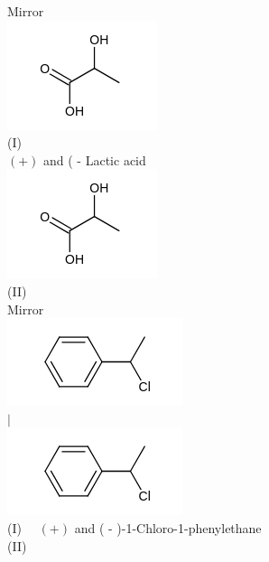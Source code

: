 \documentclass[10pt]{article}
\begin{document}
Mirror\\
\includegraphics{smile-bdf290696d2bf8bd87e155893e65bb9cb0890498}\\
(I)\\
$(+)$ and ( - Lactic acid\\
\includegraphics{smile-ead6a410f8a91f9039694c58b2e17f55221da9fd}\\
(II)\\
Mirror\\
\includegraphics{smile-fd49a16f1427b075210c3246838f5ee1c77d8030}\\
$\mid$\\
\includegraphics{smile-e1548f26c85168d0f61b4b992d1cdacac92afc88}\\
(I) $\quad(+)$ and ( - )-1-Chloro-1-phenylethane\\
(II)
\end{document}
